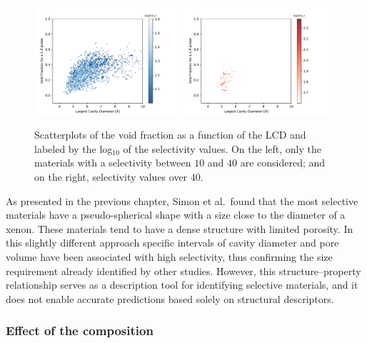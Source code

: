 \documentclass[main.tex]{subfiles}
\begin{document}
\begin{figure}[ht!]
  \centering
  \includegraphics[width=0.48\textwidth]{figures/2-thermo/Scatterplot_vf_lcd_selectivity.pdf}
  \includegraphics[width=0.48\textwidth]{figures/2-thermo/Scatterplot_vf_lcd_selectivity_zoom.pdf}  
  \caption{Scatterplots of the void fraction as a function of the LCD and labeled by the log$_{10}$ of the selectivity values. On the left, only the materials with a selectivity between $10$ and $40$ are considered; and on the right, selectivity values over $40$.}\label{fgr:lcd_vf}
\end{figure}


As presented in the previous chapter, Simon et al.\ found that the most selective materials have a pseudo-spherical shape with a size close to the diameter of a xenon. These materials tend to have a dense structure with limited porosity. In this slightly different approach specific intervals of cavity diameter and pore volume have been associated with high selectivity, thus confirming the size requirement already identified by other studies. However, this structure--property relationship serves as a description tool for identifying selective materials, and it does not enable accurate predictions based solely on structural descriptors. 

\subsubsection{Effect of the composition}
\end{document}
